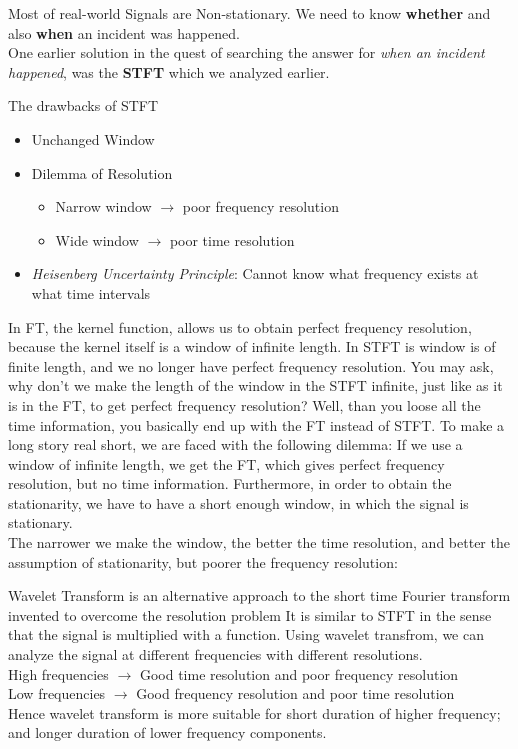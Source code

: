 Most of real-world Signals are Non-stationary. 
We need to know \textbf{whether} and also \textbf{when} an incident was happened. \\ 

One earlier solution in the quest of searching the answer for \emph{when an incident happened}, was the \textbf{STFT} which we analyzed earlier.

The drawbacks of STFT \\
\vspace{-0.4in}
\begin{itemize}
\itemsep-1em
    \item Unchanged Window
    \item Dilemma of Resolution
         \vspace{-0.2in}
	    \begin{itemize}
	    \itemsep-1em
             \item   Narrow window $\rightarrow$ poor frequency resolution 
            \item    Wide window $\rightarrow$ poor time resolution
         \end{itemize}

    \item \emph{Heisenberg Uncertainty Principle}: Cannot know what frequency exists at what time intervals
\end{itemize}

In FT, the kernel function, allows us to obtain perfect frequency resolution, because the kernel itself is a window of infinite length. In STFT is window is of finite length, and we no longer have perfect frequency resolution. You may ask, why don't we make the length of the window in the STFT infinite, just like as it is in the FT, to get perfect frequency resolution? Well, than you loose all the time information, you basically end up with the FT instead of STFT. To make a long story real short, we are faced with the following dilemma:
If we use a window of infinite length, we get the FT, which gives perfect frequency resolution, but no time information. Furthermore, in order to obtain the stationarity, we have to have a short enough window, in which the signal is stationary. \\
The narrower we make the window, the better the time resolution, and better the assumption of stationarity, but poorer the frequency resolution:

Wavelet Transform is an alternative approach to the short time Fourier transform invented to overcome the resolution problem 
It is similar to STFT in the sense that the signal is multiplied with a function. Using wavelet transfrom, we can analyze the signal at different frequencies with different resolutions.\\
High frequencies $\rightarrow$ Good time resolution and poor frequency resolution\\
Low frequencies $\rightarrow$ Good frequency resolution and poor time resolution \\
Hence wavelet transform is more suitable for short duration of higher frequency; and longer duration of lower frequency components. \\ 


